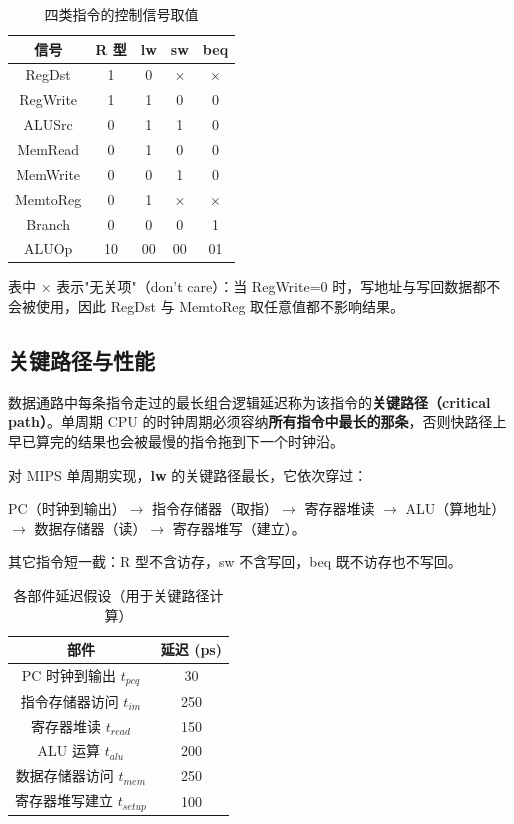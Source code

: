 \begin{table}[H]
\centering
\caption{四类指令的控制信号取值}
\label{tab:signals_by_inst}
\begin{tabulary}{\textwidth}{CCCCC}
\toprule
\textbf{信号} & \textbf{R 型} & \textbf{lw} & \textbf{sw} & \textbf{beq} \\
\midrule
RegDst   & 1 & 0 & $\times$ & $\times$ \\
RegWrite & 1 & 1 & 0 & 0 \\
ALUSrc   & 0 & 1 & 1 & 0 \\
MemRead  & 0 & 1 & 0 & 0 \\
MemWrite & 0 & 0 & 1 & 0 \\
MemtoReg & 0 & 1 & $\times$ & $\times$ \\
Branch   & 0 & 0 & 0 & 1 \\
ALUOp    & 10 & 00 & 00 & 01 \\
\bottomrule
\end{tabulary}
\end{table}

表中 $\times$ 表示"无关项"（don't care）：当 RegWrite=0 时，写地址与写回数据都不会被使用，因此 RegDst 与 MemtoReg 取任意值都不影响结果。

\subsection{关键路径与性能}
\label{sec:critical_path}

数据通路中每条指令走过的最长组合逻辑延迟称为该指令的\textbf{关键路径（critical path）}。单周期 CPU 的时钟周期必须容纳\textbf{所有指令中最长的那条}，否则快路径上早已算完的结果也会被最慢的指令拖到下一个时钟沿。

对 MIPS 单周期实现，\textbf{lw} 的关键路径最长，它依次穿过：

\begin{center}
PC（时钟到输出）$\to$ 指令存储器（取指）$\to$ 寄存器堆读 $\to$ ALU（算地址）$\to$ 数据存储器（读）$\to$ 寄存器堆写（建立）。
\end{center}

其它指令短一截：R 型不含访存，sw 不含写回，beq 既不访存也不写回。

\begin{table}[H]
\centering
\caption{各部件延迟假设（用于关键路径计算）}
\label{tab:delays}
\begin{tabulary}{\textwidth}{CC}
\toprule
\textbf{部件} & \textbf{延迟 (ps)} \\
\midrule
PC 时钟到输出 $t_{pcq}$ & 30 \\
指令存储器访问 $t_{im}$ & 250 \\
寄存器堆读 $t_{read}$ & 150 \\
ALU 运算 $t_{alu}$ & 200 \\
数据存储器访问 $t_{mem}$ & 250 \\
寄存器堆写建立 $t_{setup}$ & 100 \\
\bottomrule
\end{tabulary}
\end{table}

